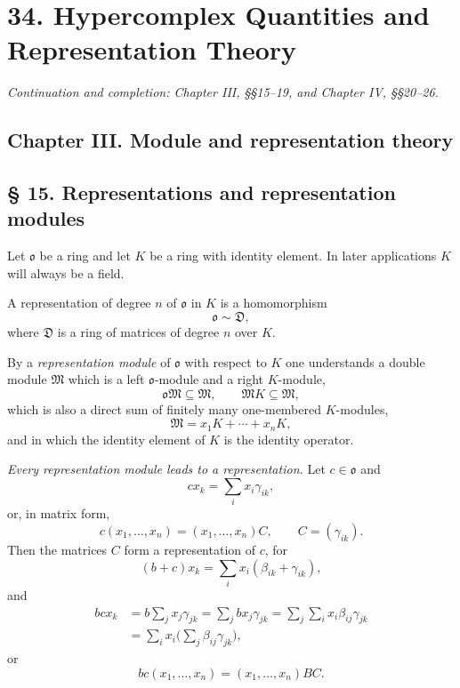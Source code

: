 \documentclass[11pt]{article}
\providecommand{\mM}{\mathfrak{M}}
\providecommand{\mo}{\mathfrak{o}}
\begin{document}
\section*{34. Hypercomplex Quantities and Representation Theory}
\emph{Continuation and completion: Chapter III, §§15--19, and Chapter IV, §§20--26.}

\subsection*{Chapter III. Module and representation theory}

\subsection*{§ 15. Representations and representation modules}
Let $\mo$ be a ring and let $K$ be a ring with identity element. In later applications $K$ will always be a field.

A representation of degree $n$ of $\mo$ in $K$ is a homomorphism
\[
        \mo \sim \mathfrak D,
\]
where $\mathfrak D$ is a ring of matrices of degree $n$ over $K$.

By a \emph{representation module} of $\mo$ with respect to $K$ one understands a double module $\mM$ which is a left $\mo$-module and a right $K$-module,
\[
        \mo\mM\subseteq \mM,
        \qquad
        \mM K\subseteq \mM,
\]
which is also a direct sum of finitely many one-membered $K$-modules,
\[
        \mM=x_1K+\cdots+x_nK,
\]
and in which the identity element of $K$ is the identity operator.

\emph{Every representation module leads to a representation.} Let $c\in\mo$ and
\[
        cx_k=\sum_i x_i\gamma_{ik},
\]
or, in matrix form,
\[
        c(x_1,\ldots,x_n)=(x_1,\ldots,x_n)C,
        \qquad C=(\gamma_{ik}).
\]
Then the matrices $C$ form a representation of $c$, for
\[
        (b+c)x_k=\sum_i x_i(\beta_{ik}+\gamma_{ik}),
\]
and
\[
\begin{aligned}
        bcx_k
        &=b\sum_jx_j\gamma_{jk}
          =\sum_j b x_j\gamma_{jk}
          =\sum_j\sum_i x_i\beta_{ij}\gamma_{jk}       \\
        &=\sum_i x_i\biggl(\sum_j\beta_{ij}\gamma_{jk}\biggr),
\end{aligned}
\]
or
\[
        bc(x_1,\ldots,x_n)=(x_1,\ldots,x_n)BC.
\]
\end{document}
